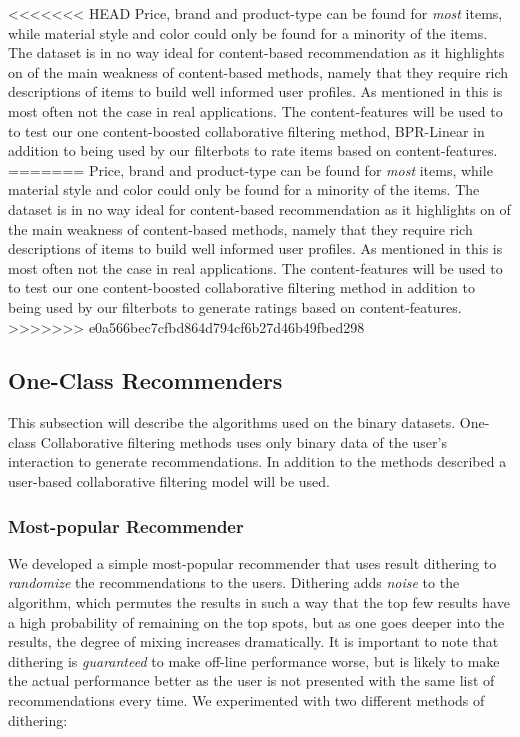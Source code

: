 <<<<<<< HEAD
Price, brand and product-type can be found for \emph{most} items, while material style
and color could only be found for a minority of the items. The dataset is in no way ideal
for content-based recommendation as it highlights on of the main weakness of content-based
methods, namely that they require rich descriptions of items to build well informed user
profiles. As mentioned in \cite{meyer2012recommender} this is most often not the case in
real applications. The content-features will be used to to test our one content-boosted collaborative
filtering method, BPR-Linear \cite{Gantner2010} in addition to being used by our filterbots to
rate items based on content-features.
=======
Price, brand and product-type can be found for \emph{most} items, while
material style and color could only be found for a minority of the items. The
dataset is in no way ideal for content-based recommendation as it highlights on
of the main weakness of content-based methods, namely that they require rich
descriptions of items to build well informed user profiles. As mentioned in
\cite{meyer2012recommender} this is most often not the case in real
applications. The content-features will be used to to test our one
content-boosted collaborative filtering method \cite{Gantner2010} in addition
to being used by our filterbots to generate ratings based on content-features.
>>>>>>> e0a566bec7cfbd864d794cf6b27d46b49fbed298

\subsection{One-Class Recommenders}

This subsection will describe the algorithms used on the binary datasets. One-class Collaborative
filtering methods uses only binary data of the user's interaction to generate recommendations.
In addition to the methods described a user-based collaborative filtering model will be used.

\subsubsection{Most-popular Recommender}

We developed a simple most-popular recommender that uses result dithering to \emph{randomize}
the recommendations to the users. Dithering adds \emph{noise} to the algorithm, which permutes
the results in such a way that the top few results have a high probability of remaining on the top spots,
but as one goes deeper into the results, the degree of mixing increases dramatically. It is important to
note that dithering is \emph{guaranteed} to make off-line performance worse, but is likely to make the
actual performance better as the user is not presented with the same list of recommendations every
time. We experimented with two different methods of dithering:

